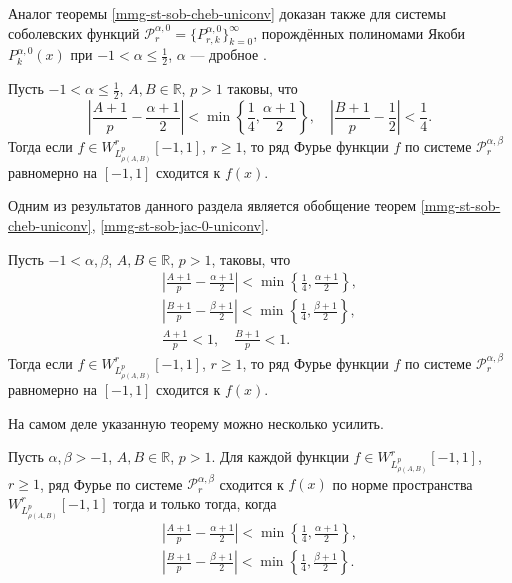 Аналог теоремы \ref{mmg-st-sob-cheb-uniconv} доказан также для системы соболевских функций $\mathcal{P}_r^{\alpha,0}=\{P_{r,k}^{\alpha,0}\}_{k=0}^\infty$, порождённых полиномами Якоби $P_k^{\alpha,0}(x)$ при $-1<\alpha\le\frac{1}{2}$, $\alpha$ --- дробное \cite[с. 10, следствие 1]{mmg-Shii-matzam2017}.
\begin{theoremA}\label{mmg-st-sob-jac-0-uniconv}
	Пусть
	$-1<\alpha\le\frac{1}{2}$, $A,B\in\mathbb{R}$, $p>1$ таковы, что
	\begin{equation*}
		\left|\frac{A+1}{p}-\frac{\alpha+1}{2}\right|<
		\min\left\{\frac{1}{4},\frac{\alpha+1}{2}\right\}, \quad
		\left|\frac{B+1}{p}-\frac{1}{2}\right|<\frac{1}{4}.
	\end{equation*}
	Тогда если $f\in W^r_{L_{\rho(A,B)}^p}[-1,1]$, $r \ge 1$, то ряд Фурье функции $f$ по системе $\mathcal{P}_r^{\alpha,\beta}$ равномерно на $[-1,1]$ сходится к $f(x)$.
\end{theoremA}

Одним из результатов данного раздела является обобщение теорем \ref{mmg-st-sob-cheb-uniconv}, \ref{mmg-st-sob-jac-0-uniconv}.
\begin{theorem}\label{mmg-sob-uni-conv-muck}
	Пусть $-1 < \alpha,\beta$, $A,B \in \mathbb{R}$, $p>1$, таковы, что
	\begin{gather}
		\label{mmg-muck-A}
		\left|\frac{A+1}{p}-\frac{\alpha+1}{2}\right|<
		\min\left\{\frac{1}{4},\frac{\alpha+1}{2}\right\},\\
		\label{mmg-muck-B}
		\left|\frac{B+1}{p}-\frac{\beta+1}{2}\right|<\min\left\{\frac{1}{4},\frac{\beta+1}{2}\right\},\\
		\label{mmg-Lpw-in-L1-cond}
		\frac{A+1}{p} < 1, \quad \frac{B+1}{p} < 1.
	\end{gather}
	Тогда если $f\in W^r_{L_{\rho(A,B)}^p}[-1,1]$, $r \ge 1$, то ряд Фурье функции $f$ по системе $\mathcal{P}_r^{\alpha,\beta}$ равномерно на $[-1,1]$ сходится к $f(x)$.
\end{theorem}
На самом деле указанную теорему можно несколько усилить.
\begin{theorem}\label{mmg-sob-conv-muck}
	Пусть $\alpha,\beta > -1$, $A,B \in \mathbb{R}$, $p>1$. Для каждой функции $f\in W^r_{L_{\rho(A,B)}^p}[-1,1]$, $r \ge 1$, ряд Фурье по системе $\mathcal{P}_r^{\alpha,\beta}$ сходится к $f(x)$ по норме пространства $W^r_{L_{\rho(A,B)}^p}[-1,1]$ тогда и только тогда, когда
	\begin{gather}
		\label{mmg-muck-A1}
		\left|\frac{A+1}{p}-\frac{\alpha+1}{2}\right|<
		\min\left\{\frac{1}{4},\frac{\alpha+1}{2}\right\},\\
		\label{mmg-muck-B1}
		\left|\frac{B+1}{p}-\frac{\beta+1}{2}\right|<\min\left\{\frac{1}{4},\frac{\beta+1}{2}\right\}.
	\end{gather}
\end{theorem}

